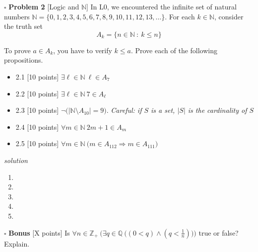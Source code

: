 \documentclass[11pt,twoside]{amsart}
\begin{document}
\newpage
 \noindent $\square$ \textbf{Problem 2}  [\textsf{Logic and $\mathbb{N}$}] In \textsf{L0}, we encountered the infinite set of natural numbers $\mathbb{N} = \{0,1,2,3,4,5,6,7,8,9,10,11, 12, 13, \ldots\}$.  For each $k \in \mathbb{N}$, consider the truth set $$A_{k} = \{n \in \mathbb{N} \ : \ k \leq n\}$$
   
 
\noindent To prove $a \in A_k$, you have to verify $k \leq a$.  Prove each of the following propositions.  \begin{itemize}
  \itemsep0em 
  \item 2.1 [10 points] $\exists \ell \in \mathbb{N} \ \ell  \in A_7$
  \item 2.2 [10 points] $\exists \ell \in \mathbb{N} \ 7  \in A_{\ell}$
\item 2.3 [10 points] $\neg \big (| \mathbb{N} \setminus A_{10} | = 9 \big )$. \textit{Careful: if $S$ is a set, $|S|$ is the cardinality of $S$} 
\item 2.4 [10 points] $\forall m \in \mathbb{N} \ 2m+1 \in A_m$
\item 2.5 [10 points] $\forall m \in \mathbb{N} \ \big (m \in A_{112} \Rightarrow m \in A_{111} \big )$

 \end{itemize} 

\emph{solution}

\begin{enumerate}[1)]
		\item  

		\item

		\item 

		\item 
		\item 
	\end{enumerate}

\newpage
\noindent $\square$ \textbf{Bonus} [X points] Is $\forall n \in \mathbb{Z}_+ \ \Bigg ( \exists q \in \mathbb{Q} \ \Big( (0< q) \land (q <  \frac{1}{n} ) \Big ) \Bigg )$ true or false? Explain. 
\end{document}
